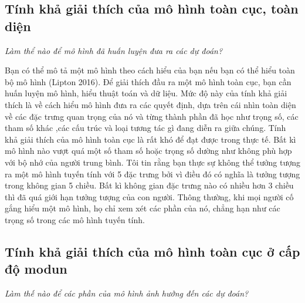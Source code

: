 \subsection{Tính khả giải thích của mô hình toàn cục, toàn diện}
\textit{Làm thể nào để mô hình đã huấn luyện đưa ra các dự đoán?}

Bạn có thể mô tả một mô hình theo cách hiểu của bạn nếu bạn có thể hiểu toàn bộ mô hình (Lipton 2016). Để giải thích đầu ra một mô hình toàn cục, bạn cần huấn luyện mô hình, hiểu thuật toán và dữ liệu. Mức độ này của tính khả giải thích là về cách hiểu mô hình đưa ra các quyết định, dựa trên cái nhìn toàn diện về các đặc trưng quan trọng của nó và từng thành phần đã học như trọng số, các tham số khác ,các cấu trúc và loại tương tác gì đang diễn ra giữa chúng. Tính khả giải thích của mô hình toàn cục là rất khó để đạt được trong thực tế. Bất kì mô hình nào vượt quá một số tham số hoặc trọng số dường như không phù hợp với bộ nhớ của người trung bình. Tôi tin rằng bạn thực sự không thể tưởng tượng ra một mô hình tuyến tính với 5 đặc trưng bởi vì điều đó có nghĩa là tưởng tượng trong không gian 5 chiều. Bất kì không gian đặc trưng nào có nhiều hơn 3 chiều thì đã quá giới hạn tưởng tượng của con người. Thông thường, khi mọi người cố gắng hiểu một mô hình, họ chỉ xem xét các phần của nó, chẳng hạn như các trọng số trong các mô hình tuyến tính.
\subsection{Tính khả giải thích của mô hình toàn cục ở cấp độ modun}
\textit{Làm thế nào để các phần của mô hình ảnh hưởng đến các dự đoán?}

